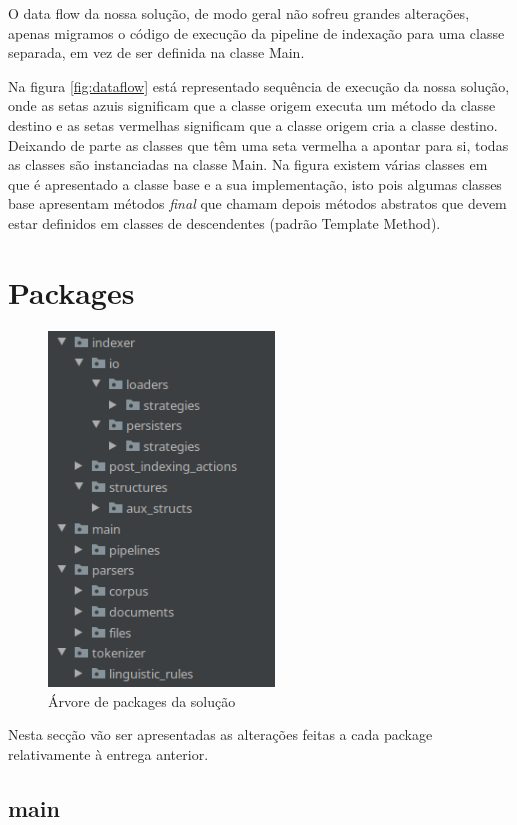 \documentclass[12pt]{article}
\begin{document}
O data flow da nossa solução, de modo geral não sofreu grandes
alterações, apenas migramos o código de execução da pipeline de
indexação para uma classe separada, em vez de ser definida na
classe Main.

Na figura \ref{fig:dataflow} está representado sequência de execução
da nossa solução, onde as setas azuis significam que a classe origem
executa um método da classe destino e as setas vermelhas significam
que a classe origem cria a classe destino. Deixando de parte as classes
que têm uma seta vermelha a apontar para si, todas as classes são
instanciadas na classe Main. Na figura existem várias classes em que é
apresentado a classe base e a sua implementação, isto pois algumas
classes base apresentam métodos {\it final} que chamam depois métodos
abstratos que devem estar definidos em classes de descendentes (padrão
Template Method).

\section{Packages}
\begin{figure}[H]
  \center
  \includegraphics[width=6cm]{packages_all.png}
  \caption{Árvore de packages da solução}
\end{figure}

Nesta secção vão ser apresentadas as alterações feitas a cada package
relativamente à entrega anterior.

\subsection{main}
\end{document}
